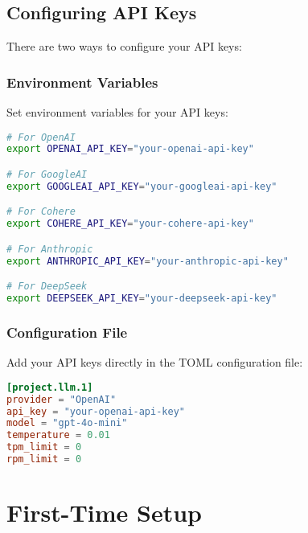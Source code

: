 \subsection{Configuring API Keys}

There are two ways to configure your API keys:

\subsubsection{Environment Variables}

Set environment variables for your API keys:

\begin{commandbox}
\begin{lstlisting}[language=Bash]
# For OpenAI
export OPENAI_API_KEY="your-openai-api-key"

# For GoogleAI
export GOOGLEAI_API_KEY="your-googleai-api-key"

# For Cohere
export COHERE_API_KEY="your-cohere-api-key"

# For Anthropic
export ANTHROPIC_API_KEY="your-anthropic-api-key"

# For DeepSeek
export DEEPSEEK_API_KEY="your-deepseek-api-key"
\end{lstlisting}
\end{commandbox}

\subsubsection{Configuration File}

Add your API keys directly in the TOML configuration file:

\begin{configbox}
\begin{lstlisting}[language=TOML]
[project.llm.1]
provider = "OpenAI"
api_key = "your-openai-api-key"
model = "gpt-4o-mini"
temperature = 0.01
tpm_limit = 0
rpm_limit = 0
\end{lstlisting}
\end{configbox}


\section{First-Time Setup}

